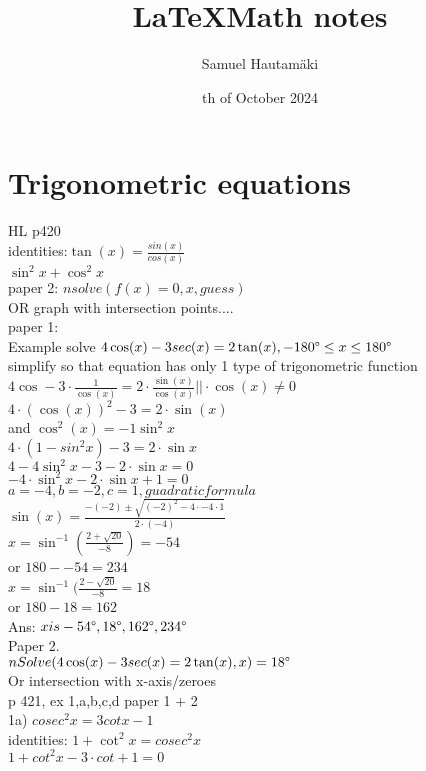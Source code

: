 \documentclass{article}
\title{\LaTeX Math notes}
\author{Samuel Hautamäki}
\date{th of October 2024}
\begin{document}
  \maketitle
   
  \section{Trigonometric equations}
  HL p420\\
  identities:$\tan(x)=\frac{sin(x)}{cos(x)}$\\
  $\sin^2x+\cos^2x$\\
  paper 2: $nsolve(f(x)=0,x,guess)$\\
  OR graph with intersection points....\\
  paper 1:\\
  Example solve $4\cos(x)-3sec(x)=2\tan(x), -180\degree\leq x\leq180\degree$\\
  simplify so that equation has only 1 type of trigonometric function\\
  $4\cos-3\cdot\frac{1}{\cos(x)}=2\cdot\frac{\sin(x)}{\cos(x)} || \cdot\cos(x)\neq0$\\
  $4\cdot(\cos(x))^2-3=2\cdot\sin(x)$\\
  and $\cos^2(x)=-1\sin^2x$\\
  $4\cdot(1-sin^2x)-3=2\cdot\sin x$\\
  $4-4\sin^2x-3-2\cdot\sin x=0$\\
  $-4\cdot\sin^2x-2\cdot\sin x+1=0$\\
  $a=-4,b=-2,c=1, guadratic formula$\\
  $\sin(x)=\frac{-(-2)\pm\sqrt{(-2)^2-4\cdot-4\cdot1}}{2\cdot(-4)}$\\
  $x=\sin^{-1}(\frac{2+\sqrt{20}}{-8})=-54$\\
  or $180--54=234$\\
  $x=\sin^{-1}(\frac{2-\sqrt{20}}{-8}=18$\\
  or $180-18=162$\\
  Ans: $x is -54\degree,18\degree,162\degree,234\degree$\\
  Paper 2.\\
  $nSolve(4\cos(x)-3sec(x)=2\tan(x),x)=18\degree$\\
  Or intersection with x-axis/zeroes\\
  p 421, ex 1,a,b,c,d paper 1 + 2\\
  1a) $cosec^2x=3 cot x-1$\\
  identities: $1+\cot^2x=cosec^2x$\\
  $1+cot^2x-3\cdot cot+1=0$\\
\end{document}
